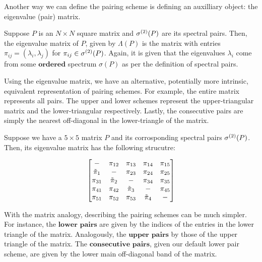 \pairingschemetable

Another way we can define the pairing scheme is defining an auxilliary object: the eigenvalue (pair) matrix.

\newpage
{}
\begin{definition}
Suppose $P$ is an $N \times N$ square matrix and ${\sigma^{(2)}}(P)$ are its spectral pairs. Then, the eigenvalue matrix of $P$, given by $\Lambda(P)$ is the matrix with entries $\pi_{ij} = (\lambda_i, \lambda_j)$ for ${\pi_{ij}} \in {\sigma^{(2)}}(P)$. Again, it is given that the eigenvalues $\lambda_i$ come from some $\textbf{ordered}$ spectrum $\sigma(P)$ as per the definition of spectral pairs.
\end{definition}

Using the eigenvalue matrix, we have an alternative, potentially more intrinsic, equivalent representation of pairing schemes. For example, the entire matrix represents all pairs. The upper and lower schemes represent the upper-triangular matrix and the lower-triangular respectively. Lastly, the consecutive pairs are simply the nearest off-diagonal in the lower-triangle of the matrix.

\begin{example}
Suppose we have a $5 \times 5$ matrix $P$ and its corrosponding spectral pairs ${\sigma^{(2)}}(P)$. Then, its eigenvalue matrix has the following strucutre:
\end{example}
$$
\begin{bmatrix}
-      & \pi_{12} & \pi_{13}   & \pi_{14} & \pi_{15} \\
{\tilde{\pi}}_{1} & -      & \pi_{23}   & \pi_{24} & \pi_{25} \\
\pi_{31} & {\tilde{\pi}}_{2} & -        & \pi_{34} & \pi_{35} \\
\pi_{41} & \pi_{42} & {\tilde{\pi}}_{3} & -        & \pi_{45} \\
\pi_{51} & \pi_{52} & \pi_{53} & {\tilde{\pi}}_{4} & -        \\
\end{bmatrix}
$$

With the matrix analogy, describing the pairing schemes can be much simpler. For instance, the $\textbf{lower pairs}$ are given by the indices of the entries in the lower triangle of the matrix. Analogously, the $\textbf{upper pairs}$ by those of the upper triangle of the matrix. The $\textbf{consecutive pairs}$, given our default lower pair scheme, are given by the lower main off-diagonal band of the matrix.

